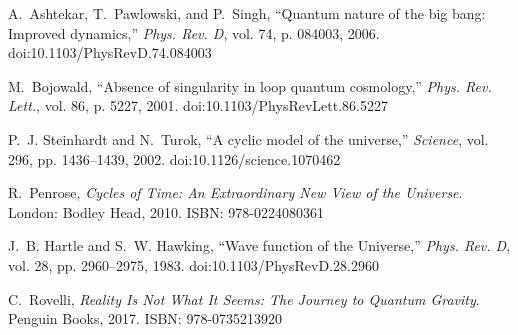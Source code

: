 \documentclass[12pt]{article}
\begin{document}
\begin{thebibliography}{9}

A.~Ashtekar, T.~Pawlowski, and P.~Singh,  
``Quantum nature of the big bang: Improved dynamics,''  
\emph{Phys. Rev. D}, vol. 74, p. 084003, 2006.  
doi:10.1103/PhysRevD.74.084003

M.~Bojowald,  
``Absence of singularity in loop quantum cosmology,''  
\emph{Phys. Rev. Lett.}, vol. 86, p. 5227, 2001.  
doi:10.1103/PhysRevLett.86.5227

P.~J. Steinhardt and N.~Turok,  
``A cyclic model of the universe,''  
\emph{Science}, vol. 296, pp. 1436–1439, 2002.  
doi:10.1126/science.1070462

R.~Penrose,  
\emph{Cycles of Time: An Extraordinary New View of the Universe}.  
London: Bodley Head, 2010. ISBN: 978-0224080361

J.~B. Hartle and S.~W. Hawking,  
``Wave function of the Universe,''  
\emph{Phys. Rev. D}, vol. 28, pp. 2960–2975, 1983.  
doi:10.1103/PhysRevD.28.2960

C.~Rovelli,  
\emph{Reality Is Not What It Seems: The Journey to Quantum Gravity}.  
Penguin Books, 2017. ISBN: 978-0735213920

\end{thebibliography}
\end{document}
